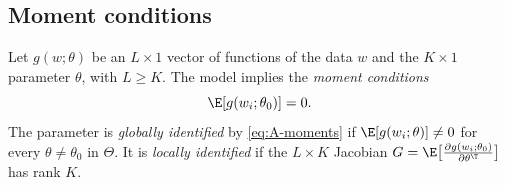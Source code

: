 \subsection{Moment conditions}\label{sec:A-gmm-moments}

\begin{definition}\label{def:A-moments}
Let $g(w;\theta)$ be an $L \times 1$ vector of functions of the data $w$ and the $K \times 1$ parameter $\theta$, with
$L \ge K$. The model implies the \emph{moment conditions}
\begin{equation}\label{eq:A-moments}
  \E[g(w_i;\theta_0)] = 0.
\end{equation}
The parameter is \emph{globally identified} by \eqref{eq:A-moments} if $\E[g(w_i;\theta)] \ne 0$ for every
$\theta \ne \theta_0$ in $\Theta$. It is \emph{locally identified} if the $L \times K$ Jacobian
$G = \E\big[\frac{\partial g(w_i;\theta_0)}{\partial\theta^\T}\big]$ has rank $K$.
\end{definition}

